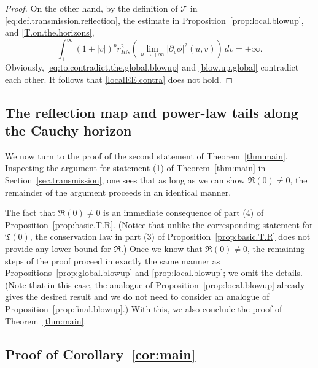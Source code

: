 \documentclass[10pt, reqno]{amsart}
\theoremstyle{definition}
\theoremstyle{remark}
\numberwithin{equation}{section}
\newcommand{\rd}{\partial}
\newcommand{\0}{\emptyset}
\begin{document}
\begin{proof}
On the other hand, by the definition of $\mathcal T$ in \eqref{eq:def.transmission.reflection}, the estimate in Proposition~\ref{prop:local.blowup}, and \eqref{T.on.the.horizons},
\begin{equation}\label{blow.up.global}
\int_1^\infty (1+|v|)^{p} r_{RN}^2 (\lim_{u\to +\infty}|\rd_v\phi|^2(u,v)) \, dv = +\infty.
\end{equation}
Obviously, \eqref{eq:to.contradict.the.global.blowup} and \eqref{blow.up.global} contradict each other. It follows that \eqref{localEE.contra} does not hold. \qedhere
\end{proof}

\subsection{The reflection map and power-law tails along the Cauchy horizon}\label{sec.reflection}

We now turn to the proof of the second statement of Theorem~\ref{thm:main}. Inspecting the argument for statement (1) of Theorem~\ref{thm:main} in Section~\ref{sec.transmission}, one sees that as long as we can show $\mathfrak R(0)\neq 0$, the remainder of the argument proceeds in an identical manner. 

The fact that $\mathfrak R(0)\neq 0$ is an immediate consequence of part (4) of Proposition~\ref{prop:basic.T.R}. (Notice that unlike the corresponding statement for $\mathfrak T(0)$, the conservation law in part (3) of Proposition~\ref{prop:basic.T.R} does not provide any lower bound for $\mathfrak R$.) Once we know that $\mathfrak R(0)\neq 0$, the remaining steps of the proof proceed in exactly the same manner as Propositions~\ref{prop:global.blowup} and \ref{prop:local.blowup}; we omit the details. (Note that in this case, the analogue of Proposition~\ref{prop:local.blowup} already gives the desired result and we do not need to consider an analogue of Proposition~\ref{prop:final.blowup}.) With this, we also conclude the proof of Theorem~\ref{thm:main}.

\subsection{Proof of Corollary~\ref{cor:main}}\label{sec:pf.cor.main}
\end{document}

